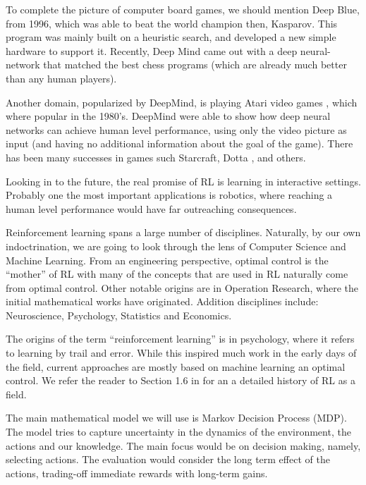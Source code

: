 To complete the picture of computer board games, we should mention
Deep Blue, from 1996, which was able to beat the world champion then,
Kasparov. This program was mainly built on a heuristic search, and
developed a new simple hardware to support it. Recently, Deep Mind
came out with a deep neural-network that matched the best chess
programs (which are already much better than any human players).

Another domain, popularized by DeepMind, is playing Atari video
games \cite{XX}, which where popular in the 1980's. DeepMind were able to
show how deep neural networks can achieve human level performance,
using only the video picture as input (and having no additional
information about the goal of the game). There has been many successes in games
such Starcraft\cite{xx}, Dotta \cite{xx}, and others.

Looking in to the future, the real promise of RL
is learning in interactive settings. Probably one the most important
applications is robotics, where reaching a human level performance
would have far outreaching consequences.

 \medskip
{}
%
Reinforcement learning spans a large number of disciplines.
Naturally, by our own indoctrination, we are going to look through the lens of Computer Science
and Machine Learning. From an engineering perspective, optimal control is 
the ``mother'' of RL with many of the concepts that are used in RL naturally come from optimal control. 
Other notable origins are in Operation Research, where the initial mathematical works have originated.
Addition disciplines include: Neuroscience, Psychology, Statistics and
Economics.

The origins of the term ``reinforcement learning'' is in psychology, where it refers to learning by trail and error. 
While this inspired much work in the early days of the field, current approaches are mostly based on
machine learning an optimal control. We refer the reader to Section 1.6 in \cite{book:Sutton} for an
a detailed history of RL as a field. 

\medskip
{}
%
The main mathematical model we will use is Markov Decision Process
(MDP). The model tries to capture uncertainty in the dynamics of the
environment, the actions and our knowledge. The main focus would be
on decision making, namely, selecting actions. The evaluation would
consider the long term effect of the actions, trading-off immediate
rewards with long-term gains.

